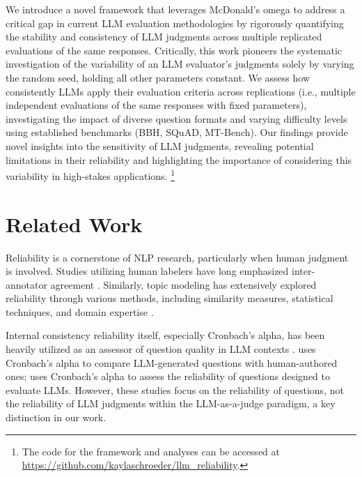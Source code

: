\documentclass[11pt]{article}
\begin{document}
We introduce a novel framework that leverages McDonald's omega to address a critical gap in current LLM evaluation methodologies by rigorously quantifying the stability and consistency of LLM judgments across multiple replicated evaluations of the same responses. Critically, this work pioneers the systematic investigation of the variability of an LLM evaluator's judgments solely by varying the random seed, holding all other parameters constant. We assess how consistently LLMs apply their evaluation criteria across replications (i.e., multiple independent evaluations of the same responses with fixed parameters), investigating the impact of diverse question formats and varying difficulty levels using established benchmarks (BBH, SQuAD, MT-Bench). Our findings provide novel insights into the sensitivity of LLM judgments, revealing potential limitations in their reliability and highlighting the importance of considering this variability in high-stakes applications. \footnote{The code for the framework and analyses can be accessed at \href{https://github.com/kaylaschroeder/llm_reliability}{https://github.com/kaylaschroeder/llm\_reliability}.}


\section{Related Work}

Reliability is a cornerstone of NLP research, particularly when human judgment is involved. Studies utilizing human labelers have long emphasized inter-annotator agreement \citep{bhowmick2008agreement,nowak2010reliable,amidei2019agreement}. Similarly, topic modeling has extensively explored reliability through various methods, including similarity measures, statistical techniques, and domain expertise \citep{rieger2024ldaprototype, schroeder2024reliability, chuang2015topiccheck}. 


Internal consistency reliability itself, especially Cronbach's alpha, has been heavily utilized as an assessor of question quality in LLM contexts \citep{shang2024trusting, chan2023assessing, biri2023assessing}. \citet{bhandari2024evaluating} uses Cronbach's alpha to compare LLM-generated questions with human-authored ones; \citet{shi2023llm} uses Cronbach's alpha to assess the reliability of questions designed to evaluate LLMs. However, these studies focus on the reliability of questions, not the reliability of LLM judgments within the LLM-as-a-judge paradigm, a key distinction in our work.
\end{document}
